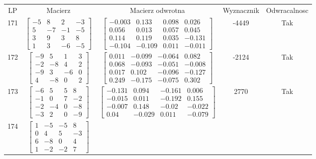 \documentclass[a4paper,12pt]{article}
\begin{document}
\bgroup {} \vspace{0.2in} \begin{tabular}{c c c c c}
LP & Macierz & Macierz odwrotna & Wyznacznik & Odwracalnosc\\
171
&
$\begin{bmatrix} -5 & 8 & 2 & -3 \\ 5 & -7 & -1 & -5 \\ 3 & 9 & 3 & 8 \\ 1 & 3 & -6 & -5 \end{bmatrix}$
&
$\begin{bmatrix} -0.003 & 0.133 & 0.098 & 0.026 \\ 0.056 & 0.013 & 0.057 & 0.045 \\ 0.114 & 0.119 & 0.035 & -0.131 \\ -0.104 & -0.109 & 0.011 & -0.011 \end{bmatrix}$
&
-4449
&
Tak
\\
172
&
$\begin{bmatrix} -9 & 5 & 1 & 3 \\ -2 & -8 & 4 & 2 \\ -9 & 3 & -6 & 0 \\ 4 & -8 & 0 & 2 \end{bmatrix}$
&
$\begin{bmatrix} 0.011 & -0.099 & -0.064 & 0.082 \\ 0.068 & -0.093 & -0.051 & -0.008 \\ 0.017 & 0.102 & -0.096 & -0.127 \\ 0.249 & -0.175 & -0.075 & 0.302 \end{bmatrix}$
&
-2124
&
Tak
\\
173
&
$\begin{bmatrix} -6 & 5 & 5 & 8 \\ -1 & 0 & 7 & -2 \\ -2 & -4 & 0 & -8 \\ -3 & 2 & 0 & -9 \end{bmatrix}$
&
$\begin{bmatrix} -0.131 & 0.094 & -0.161 & 0.006 \\ -0.015 & 0.011 & -0.192 & 0.155 \\ -0.007 & 0.148 & -0.02 & -0.022 \\ 0.04 & -0.029 & 0.011 & -0.079 \end{bmatrix}$
&
2770
&
Tak
\\
174
&
$\begin{bmatrix} 1 & -5 & -5 & 8 \\ 0 & 4 & 5 & -3 \\ 6 & -8 & 0 & 4 \\ 1 & -2 & -2 & 7 \end{bmatrix}$

\end{tabular}
\end{document}
